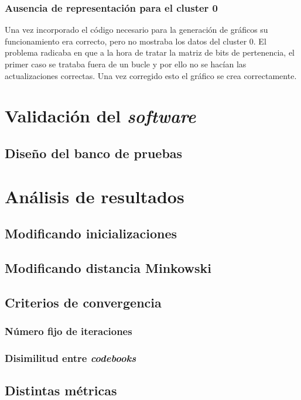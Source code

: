 \documentclass[10pt,a4paper]{article}
\begin{document}
\subsubsection{Ausencia de representación para el cluster 0}
Una vez incorporado el código necesario para la generación de gráficos su funcionamiento era correcto, pero no mostraba los datos del cluster 0. El problema radicaba
 en que a la hora de tratar la matriz de bits de pertenencia, el primer caso se trataba fuera de un bucle y por ello no se hacían las actualizaciones correctas. Una 
 vez corregido esto el gráfico se crea correctamente.


\section{Validación del \textit{software}}

\subsection{Diseño del banco de pruebas}

\section{Análisis de resultados}

\subsection{Modificando inicializaciones}

\subsection{Modificando distancia Minkowski}

\subsection{Criterios de convergencia}

\subsubsection{Número fijo de iteraciones}

\subsubsection{Disimilitud entre \textit{codebooks}}

\subsection{Distintas métricas}
\end{document}
